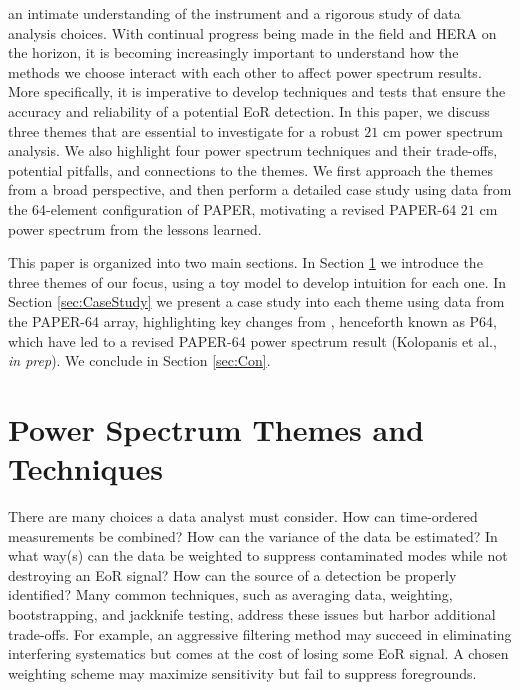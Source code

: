 \documentclass[preprint2,numberedappendix,tighten]{aastex6}  %
\begin{document}
an intimate understanding of the instrument and a rigorous study of data analysis choices. With continual progress being made 
in the field and HERA on the horizon, it is becoming increasingly important to understand how the methods we choose interact 
with each other to affect power spectrum results. More specifically, it is imperative to develop techniques and tests that ensure 
the accuracy and reliability of a potential EoR detection. In this paper, we discuss three themes that are essential to investigate 
for a robust $21$ cm power spectrum analysis. We also highlight four power spectrum techniques and their trade-offs, potential 
pitfalls, and connections to the themes. We first approach the themes from a broad perspective, and then perform a detailed 
case study using data from the 64-element configuration of PAPER, motivating a revised PAPER-64 $21$ cm power spectrum 
from the lessons learned.

This paper is organized into two main sections. In Section \ref{sec:Themes} we introduce the three themes of our focus, using a 
toy model to develop intuition for each one. In Section \ref{sec:CaseStudy} we present a case study into each theme using data 
from the PAPER-64 array, highlighting key changes from \citet{ali_et_al2015}, henceforth known as P64, which have led to a 
revised PAPER-64 power spectrum result (Kolopanis et al., \textit{in prep}). We conclude in Section \ref{sec:Con}.


\section{Power Spectrum Themes and Techniques}
\label{sec:Themes}

There are many choices a data analyst must consider. How can time-ordered measurements be combined? How can the 
variance of the data be estimated? In what way(s) can the data be weighted to suppress contaminated modes while not 
destroying an EoR signal? How can the source of a detection be properly identified? Many common techniques, such as 
averaging data, weighting, bootstrapping, and jackknife testing, address these issues but harbor additional trade-offs. For 
example, an aggressive filtering method may succeed in eliminating interfering systematics but comes at the cost of losing 
some EoR signal. A chosen weighting scheme may maximize sensitivity but fail to suppress foregrounds. 
\end{document}
